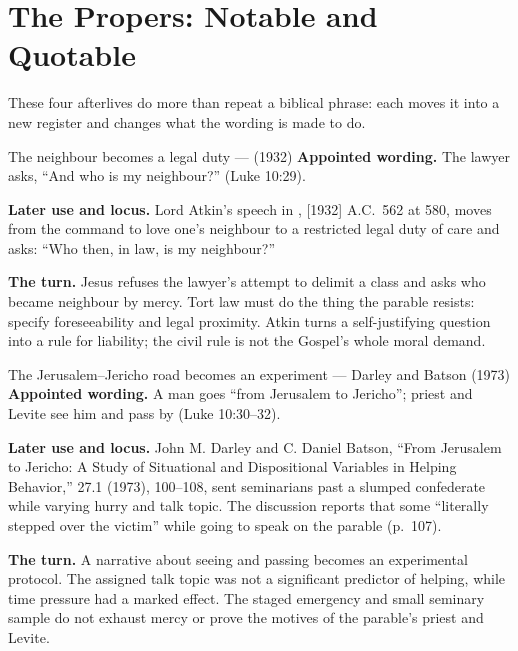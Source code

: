 \sectionguard
\section*{The Propers: Notable and Quotable}

These four afterlives do more than repeat a biblical phrase: each moves it into
a new register and changes what the wording is made to do.

\begin{afterlife}{The neighbour becomes a legal duty ---  (1932)}
\textbf{Appointed wording.} The lawyer asks, ``And who is my neighbour?''
(Luke 10:29).

\textbf{Later use and locus.} Lord Atkin's speech in , [1932] A.C.~562 at 580, moves from the command to love one's
neighbour to a restricted legal duty of care and asks: ``Who then, in law, is
my neighbour?''

\textbf{The turn.} Jesus refuses the lawyer's attempt to delimit
a class and asks who became neighbour by mercy. Tort law must do the thing the
parable resists: specify foreseeability and legal proximity. Atkin turns a
self-justifying question into a rule for liability; the civil rule is
not the Gospel's whole moral demand.
\end{afterlife}

\begin{afterlife}{The Jerusalem--Jericho road becomes an experiment --- Darley and Batson (1973)}
\textbf{Appointed wording.} A man goes ``from Jerusalem to Jericho''; priest
and Levite see him and pass by (Luke 10:30--32).

\textbf{Later use and locus.} John M. Darley and C. Daniel Batson, ``From
Jerusalem to Jericho: A Study of Situational and Dispositional Variables in
Helping Behavior,''  27.1
(1973), 100--108, sent seminarians past a slumped confederate while varying
hurry and talk topic. The discussion reports that some ``literally stepped
over the victim'' while going to speak on the parable (p.~107).

\textbf{The turn.} A narrative about seeing and passing becomes
an experimental protocol. The assigned talk topic was not a significant
predictor of helping, while time pressure had a marked effect. The staged
emergency and small seminary sample do
not exhaust mercy or prove the motives of the parable's priest and Levite.
\end{afterlife}

